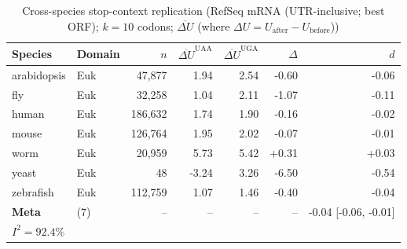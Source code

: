 
\begin{table}[htbp]
\centering
\caption{Cross-species stop-context replication (RefSeq mRNA (UTR-inclusive; best ORF); $k=10$ codons; $\overline{\Delta U}$ (where $\Delta U = U_{\mathrm{after}}-U_{\mathrm{before}}$))}
\label{tab:cross_species_stop_context_mrna_eukarya_u_diff}
\begin{tabular}{llrrrrr}
\toprule
Species & Domain & $n$ & $\overline{\Delta U}^{\mathrm{UAA}}$ & $\overline{\Delta U}^{\mathrm{UGA}}$ & $\Delta$ & $d$ \\
\midrule
arabidopsis & Euk & 47,877 & 1.94 & 2.54 & -0.60 & -0.06 \\
fly & Euk & 32,258 & 1.04 & 2.11 & -1.07 & -0.11 \\
human & Euk & 186,632 & 1.74 & 1.90 & -0.16 & -0.02 \\
mouse & Euk & 126,764 & 1.95 & 2.02 & -0.07 & -0.01 \\
worm & Euk & 20,959 & 5.73 & 5.42 & +0.31 & +0.03 \\
yeast & Euk & 48 & -3.24 & 3.26 & -6.50 & -0.54 \\
zebrafish & Euk & 112,759 & 1.07 & 1.46 & -0.40 & -0.04 \\
\midrule
\textbf{Meta} & (7) & -- & -- & -- & -- & -0.04 [-0.06, -0.01] \\
\multicolumn{7}{l}{$I^2 = 92.4\%$} \\
\bottomrule
\end{tabular}
\end{table}
